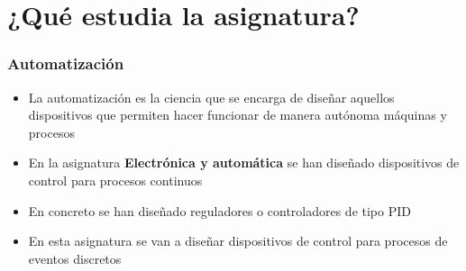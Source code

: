 \section{¿Qué estudia la asignatura?}

\begin{frame}[t,fragile, label=sistemas]
\frametitle{Automatización}

\begin{itemize}
\item La automatización es la ciencia que se encarga de diseñar aquellos dispositivos que permiten hacer funcionar de manera autónoma máquinas y procesos

\item En la asignatura \textbf{Electrónica y automática} se han diseñado dispositivos de control para procesos continuos

\item En concreto se han diseñado reguladores o controladores de tipo PID

\item En esta asignatura se van a diseñar dispositivos de control para procesos de eventos discretos
\end{itemize}
   
\end{frame}
